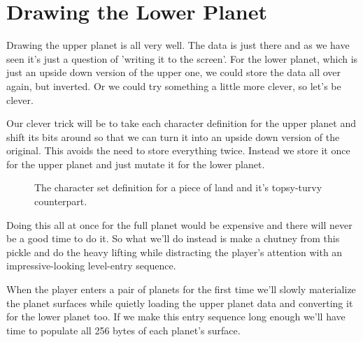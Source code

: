 \section{Drawing the Lower Planet}
Drawing the upper planet is all very well. The data is just there and as we have seen it's just a question
of 'writing it to the screen'. For the lower planet, which is just an upside down version of the upper one,
we could store the data all over again, but inverted. Or we could try something a little more clever,
so let's be clever.

Our clever trick will be to take each character definition for the upper planet and shift its bits around
so that we can turn it into an upside down version of the original. This avoids the need to store everything
twice. Instead we store it once for the upper planet and just mutate it for the lower planet.

\begin{figure}[H]
{
  \setlength{\tabcolsep}{3.0pt}
  \setlength\cmidrulewidth{\heavyrulewidth} %
    \begin{adjustbox}{width=10cm,center}
  \begin{subfigure}{0.3\textwidth}
  
  \end{subfigure}
  \begin{subfigure}{0.3\textwidth}
  
  \end{subfigure}
  \end{adjustbox}
}\caption[]{The character set definition for a piece of land and it's topsy-turvy counterpart.}
\end{figure}

Doing this all at once for the full planet would be expensive and there will never be a good time to do it.
So what we'll do instead is make a chutney from this pickle and do the heavy lifting while distracting the
player's attention with an impressive-looking level-entry sequence.

When the player enters a pair of planets for the first time we'll slowly materialize the planet surfaces
while quietly loading the upper planet data and converting it for the lower planet too. If we make
this entry sequence long enough we'll have time to populate all 256 bytes of each planet's surface.

